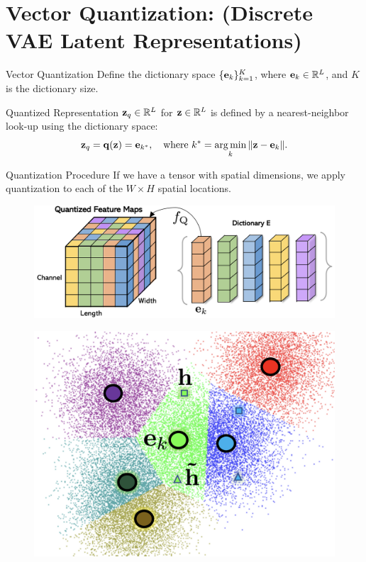 \documentclass{beamer}
\begin{document}
\section{Vector Quantization: (Discrete VAE Latent Representations)}
\begin{frame}{Vector Quantization}
	Define the dictionary space $\{\mathbf{e}_k\}_{k=1}^K$, where $\mathbf{e}_k \in \mathbb{R}^L$, and $K$ is the dictionary size.
	\begin{block}{Quantized Representation}
		$\mathbf{z}_q \in \mathbb{R}^{L}$  for $\mathbf{z} \in \mathbb{R}^L$ is defined by a nearest-neighbor look-up using the dictionary space:
		\vspace{-0.3cm}
		\[
		\mathbf{z}_q = \mathbf{q} (\mathbf{z}) = \mathbf{e}_{k^*}, \quad \text{where } k^* = \operatorname*{arg\,min}_k \| \mathbf{z} - \mathbf{e}_k \|.
		\] 
		\vspace{-0.7cm}
	\end{block}
	\vspace{-0.2cm}
	\begin{block}{Quantization Procedure}
		If we have a tensor with spatial dimensions, we apply quantization to each of the $W \times H$ spatial locations.
		\begin{minipage}[t]{0.65\columnwidth}
			\begin{figure}
				\includegraphics[width=0.8\linewidth]{figs/fqgan_cnn.png}
			\end{figure}
		\end{minipage}%
		\begin{minipage}[t]{0.35\columnwidth}
			\begin{figure}
				\includegraphics[width=0.7\linewidth]{figs/fqgan_lookup}
			\end{figure}
		\end{minipage}
	\end{block}
\end{frame}
\end{document}

